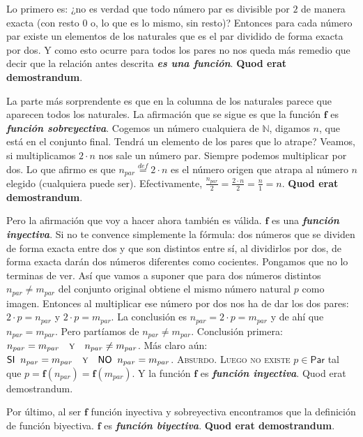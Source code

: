 \documentclass{amsart}
\theoremstyle{definition}
\theoremstyle{remark}
\numberwithin{equation}{section}
\newcommand{\setN}{\mathds N}
\newcommand{\monrel}[1]{\mathbf{#1}}
\newcommand{\funct}[1]{\monrel{#1}}
\newcommand{\functat}[2]{\funct{#1}{\left({#2}\right)}}
\newcommand{\defin}{\overset {def}{=}}
\begin{document}
	Lo primero es: ¿no es verdad que todo número par es divisible por $2$ de 
manera exacta (con resto $0$ o, lo que es lo mismo, sin resto)? Entonces para 
cada número par existe un elementos de los naturales que es el par dividido 
de forma exacta por dos. Y como esto ocurre para todos los pares no nos queda 
más remedio que decir que la relación antes descrita \textbf{\emph{es una 
función}}. \textbf{\textsf{Quod erat demostrandum}}.


	La parte más sorprendente es que en la columna de los naturales parece 
que aparecen todos los naturales. La afirmación que se sigue es que la 
función $\funct{f}$ es \textbf{\emph{función sobreyectiva}}. Cogemos un 
número cualquiera de $\setN$, digamos $n$, que está en el conjunto final. 
Tendrá un elemento de los pares que lo atrape? Veamos, si multiplicamos $2 
\cdot n$ nos sale un número par. Siempre podemos multiplicar por dos. Lo que 
afirmo es que $n_{par} \defin 2 \cdot n$ es el número origen que atrapa al 
número $n$ elegido (cualquiera puede ser). Efectivamente, $\frac{n_{par}}{2} 
= \frac{2 \cdot n}{2} = \frac{n}{1} = n$. \textbf{\textsf{Quod erat 
demostrandum}}.

	Pero la afirmación que voy a hacer ahora también es válida. $\funct{f}$ 
es una \textbf{\emph{función inyectiva}}. Si no te convence simplemente la 
fórmula: dos números que se dividen de forma exacta entre dos y que son 
distintos entre sí, al dividirlos por dos, de forma exacta darán dos números 
diferentes como cocientes. Pongamos que no lo terminas de ver. Así que vamos 
a suponer que para dos números distintos $n_{par}\neq m_{par}$ del conjunto 
original obtiene el mismo número natural $p$ como imagen. Entonces al 
multiplicar ese número por dos nos ha de dar los dos pares: $2 \cdot p = 
n_{par}$ y $2 \cdot p = m_{par}$. La conclusión es $n_{par} = 2 \cdot p = 
m_{par}$ y de ahí que $n_{par} = m_{par}$. Pero partíamos de $n_{par} \neq 
m_{par}$. Conclusión primera: $n_{par} = m_{par} \quad \textsc{y} \quad 
n_{par} \neq m_{par}$. Más claro aún: $\textsf{SI}\;\; n_{par} = m_{par} 
\quad \textsc{y} \quad \textsf{NO}\;\; n_{par} = m_{par}$. \textsc{Absurdo}. 
\textsc{Luego no existe }$p\in\textsf{Par}$ tal que 
$p=\functat{f}{n_{par}}=\functat{f}{m_{par}}$. Y la función $\funct{f}$ es 
\textbf{\emph{función inyectiva}}. \textsf{Quod erat demostrandum}.



	Por último, al ser $\funct{f}$ función inyectiva y sobreyectiva 
encontramos que la definición de función biyectiva. $\funct{f}$ es 
\textbf{\emph{función biyectiva}}. \textbf{\textsf{Quod erat demostrandum}}.
\end{document}
